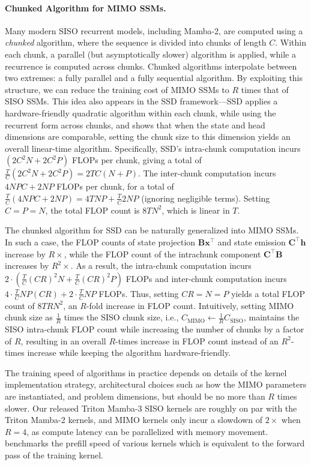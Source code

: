 \documentclass{article}
\def\vh{{\bm{h}}}
\def\vx{{\bm{x}}}
\def\bB{{\bm{B}}}
\def\bC{{\bm{C}}}
\theoremstyle{plain}
\theoremstyle{definition}
\theoremstyle{remark}
\begin{document}
\paragraph{Chunked Algorithm for MIMO SSMs.}
Many modern SISO recurrent models, including Mamba-2, are computed using a \emph{chunked} algorithm, where the sequence is divided into chunks of length $C$. Within each chunk, a parallel (but asymptotically slower) algorithm is applied, while a recurrence is computed across chunks.
Chunked algorithms interpolate between two extremes: a fully parallel and a fully sequential algorithm. By exploiting this structure, we can reduce the training cost of MIMO SSMs to $R$ times that of SISO SSMs.
This idea also appears in the SSD framework---SSD applies a hardware-friendly quadratic algorithm within each chunk, while using the recurrent form across chunks, and shows that when the state and head dimensions are comparable, setting the chunk size to this dimension yields an overall linear-time algorithm.
Specifically, SSD's intra-chunk computation incurs $\left(2C^2 N + 2C^2 P\right)$ FLOPs per chunk, giving a total of $\frac{T}{C}\left(2C^2 N + 2C^2 P \right) = 2TC(N+P)$. The inter-chunk computation incurs $4NPC + 2NP$ FLOPs per chunk, for a total of $\frac{T}{C}(4NPC + 2NP) = 4TNP + \frac{T}{C}2NP$ (ignoring negligible terms). Setting $C=P=N$, the total FLOP count is $8TN^2$, which is linear in $T$.

The chunked algorithm for SSD can be naturally generalized into MIMO SSMs.
In such a case, the FLOP counts of state projection $\bB \vx^\top$ and state emission $\bC^\top \vh$ increase by $R\times$, while the FLOP count of the intrachunk component $\bC^\top\bB$ increases by $R^2\times$. As a result, the intra-chunk computation incurs  $2 \cdot \left(\frac{T}{C} (CR)^2 N + \frac{T}{C} (CR)^2 P\right)$ FLOPs and inter-chunk computation incurs $4\cdot\frac{T}{C}NP(CR) + 2\cdot\frac{T}{C}NP$ FLOPs.
Thus, setting $CR=N=P$ yields a total FLOP count of $8TRN^2$, an $R$-fold increase in FLOP count. Intuitively, setting MIMO chunk size as $\frac{1}{R}$ times the SISO chunk size, i.e., $C_{\text{MIMO}} \gets \frac{1}{R}C_{\text{SISO}}$, maintains the SISO intra-chunk FLOP count while increasing the number of chunks by a factor of $R$, resulting in an overall $R$-times increase in FLOP count instead of an $R^2$-times increase while keeping the algorithm hardware-friendly.

The training speed of algorithms in practice depends on details of the kernel implementation strategy, architectural choices such as how the MIMO parameters are instantiated, and problem dimensions, but should be no more than $R$ times slower.
Our released Triton Mamba-3 SISO kernels are roughly on par with the Triton Mamba-2 kernels, and MIMO kernels only incur a slowdown of $2 {\scriptstyle\times}$ when $R=4$, as compute latency can be parallelized with memory movement.  benchmarks the prefill speed of various kernels which is equivalent to the forward pass of the training kernel.
\end{document}
